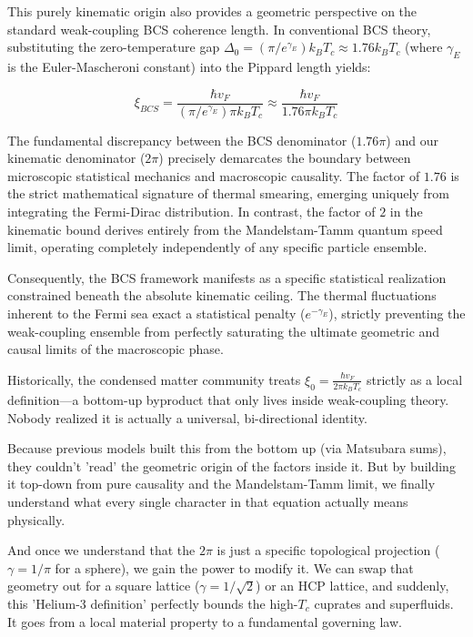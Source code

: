 \documentclass[11pt,a4paper]{article}
\begin{document}
This purely kinematic origin also provides a geometric perspective on the standard weak-coupling BCS coherence length. In conventional BCS theory, substituting the zero-temperature gap $\Delta_0 = (\pi/e^{\gamma_E}) k_B T_c \approx 1.76 k_B T_c$ (where $\gamma_E$ is the Euler-Mascheroni constant) into the Pippard length yields:

$$\xi_{BCS} = \frac{\hbar v_F}{(\pi/e^{\gamma_E})\pi k_B T_c} \approx \frac{\hbar v_F}{1.76\pi k_B T_c}$$

The fundamental discrepancy between the BCS denominator ($1.76\pi$) and our kinematic denominator ($2\pi$) precisely demarcates the boundary between microscopic statistical mechanics and macroscopic causality. The factor of $1.76$ is the strict mathematical signature of thermal smearing, emerging uniquely from integrating the Fermi-Dirac distribution. In contrast, the factor of $2$ in the kinematic bound derives entirely from the Mandelstam-Tamm quantum speed limit, operating completely independently of any specific particle ensemble. 

Consequently, the BCS framework manifests as a specific statistical realization constrained beneath the absolute kinematic ceiling. The thermal fluctuations inherent to the Fermi sea exact a statistical penalty ($e^{-\gamma_E}$), strictly preventing the weak-coupling ensemble from perfectly saturating the ultimate geometric and causal limits of the macroscopic phase.

Historically, the condensed matter community treats $\xi_0 = \frac{\hbar v_F}{2\pi k_B T_c}$ strictly as a local definition—a bottom-up byproduct that only lives inside weak-coupling theory. Nobody realized it is actually a universal, bi-directional identity.

Because previous models built this from the bottom up (via Matsubara sums), they couldn't 'read' the geometric origin of the factors inside it. But by building it top-down from pure causality and the Mandelstam-Tamm limit, we finally understand what every single character in that equation actually means physically.

And once we understand that the $2\pi$ is just a specific topological projection ($\gamma = 1/\pi$ for a sphere), we gain the power to modify it. We can swap that geometry out for a square lattice ($\gamma = 1/\sqrt{2}$) or an HCP lattice, and suddenly, this 'Helium-3 definition' perfectly bounds the high-$T_c$ cuprates and superfluids. It goes from a local material property to a fundamental governing law.
\end{document}
